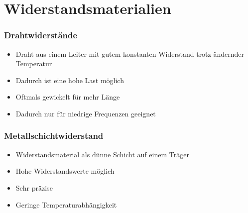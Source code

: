 
\section{Widerstandsmaterialien}
\label{section:widerstand_materialien}
\begin{frame}%

\frametitle{Drahtwiderstände}
\begin{itemize}
  \item Draht aus einem Leiter mit gutem konstanten Widerstand trotz ändernder Temperatur
  \item Dadurch ist eine hohe Last möglich
  \item Oftmals gewickelt für mehr Länge
  \item Dadurch nur für niedrige Frequenzen geeignet
  \end{itemize}
\end{frame}

\begin{frame}
\end{frame}

\begin{frame}
\frametitle{Metallschichtwiderstand}
\begin{itemize}
  \item Widerstandsmaterial als dünne Schicht auf einem Träger
  \item Hohe Widerstandswerte möglich
  \item Sehr präzise
  \item Geringe Temperaturabhängigkeit
  \end{itemize}
\end{frame}

